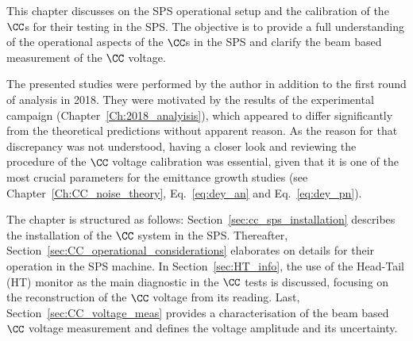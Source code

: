 \vspace*{-1mm}
This chapter discusses on the SPS operational setup and the calibration of the $\CC$s for their testing in the SPS. The objective is to provide a full understanding of the operational aspects of the $\CC$s in the SPS and clarify the beam based measurement of the $\CC$ voltage. 


The presented studies were performed by the author in addition to the first round of analysis in 2018. They were motivated by the results of the experimental campaign (Chapter~\ref{Ch:2018_analyisis}), which appeared to differ significantly from the theoretical predictions without apparent reason.
As the reason for that discrepancy was not understood, having a closer look and reviewing the procedure of the $\CC$ voltage calibration was essential, given that it is one of the most crucial parameters for the emittance growth studies (see Chapter~\ref{Ch:CC_noise_theory}, Eq.~\eqref{eq:dey_an} and Eq.~\eqref{eq:dey_pn}). 


The chapter is structured as follows: Section~\ref{sec:cc_sps_installation} describes the installation of the $\CC$ system in the SPS. Thereafter, Section~\ref{sec:CC_operational_considerations} elaborates on details for their operation in the SPS machine. In Section~\ref{sec:HT_info}, the use of the Head-Tail (HT) monitor as the main diagnostic in the $\CC$ tests is discussed, focusing on the reconstruction of the $\CC$ voltage from its reading. Last, Section~\ref{sec:CC_voltage_meas} provides a characterisation of the beam based $\CC$ voltage measurement and defines the voltage amplitude and its uncertainty.

